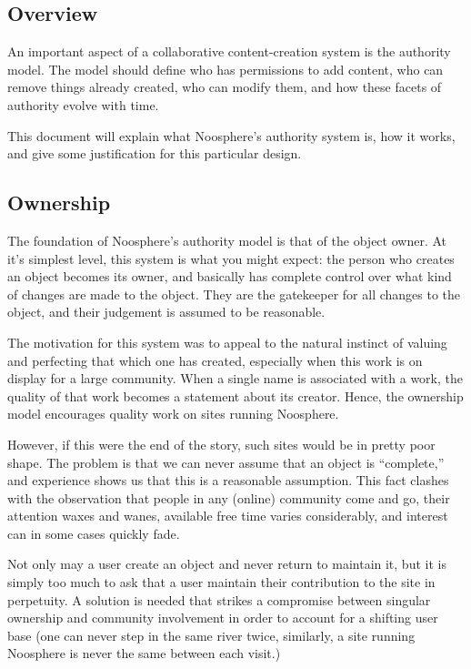 \subsection*{Overview}
An important aspect of a collaborative content-creation system is the authority model. The model should define who has permissions to add content, who can remove things already created, who can modify them, and how these facets of authority evolve with time.

This document will explain what Noosphere's authority system is, how it works, and give some justification for this particular design.

\subsection*{Ownership}
The foundation of Noosphere's authority model is that of the object owner. At it's simplest level, this system is what you might expect: the person who creates an object becomes its owner, and basically has complete control over what kind of changes are made to the object. They are the gatekeeper for all changes to the object, and their judgement is assumed to be reasonable.

The motivation for this system was to appeal to the natural instinct of valuing and perfecting that which one has created, especially when this work is on display for a large community. When a single name is associated with a work, the quality of that work becomes a statement about its creator. Hence, the ownership model encourages quality work on sites running Noosphere.

However, if this were the end of the story, such sites would be in pretty poor shape. The problem is that we can never assume that an object is ``complete,'' and experience shows us that this is a reasonable assumption. This fact clashes with the observation that people in any (online) community come and go, their attention waxes and wanes, available free time varies considerably, and interest can in some cases quickly fade.

Not only may a user create an object and never return to maintain it, but it is simply too much to ask that a user maintain their contribution to the site in perpetuity. A solution is needed that strikes a compromise between singular ownership and community involvement in order to account for a shifting user base (one can never step in the same river twice, similarly, a site running Noosphere is never the same between each visit.)

